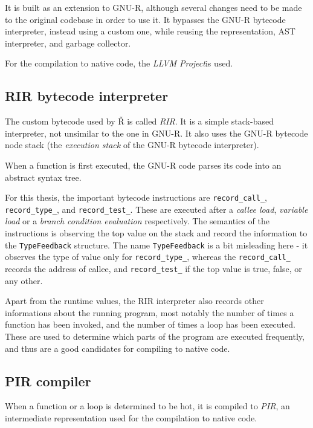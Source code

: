 It is built as an extension to GNU-R, although several changes need to be made to the original codebase in order to use it. It bypasses the GNU-R bytecode interpreter, instead using a custom one, while reusing the \SEXP representation, AST interpreter, and garbage collector.

For the compilation to native code, the \textit{LLVM Project}\todocite is used.


\subsection{RIR bytecode interpreter}

The custom bytecode used by Ř is called \textit{RIR}. It is a simple stack-based interpreter, not unsimilar to the one in GNU-R. It also uses the GNU-R bytecode node stack (the \textit{execution stack} of the GNU-R bytecode interpreter).

When a function is first executed, the GNU-R code parses its code into an abstract syntax tree.


For this thesis, the important bytecode instructions are \texttt{record\_call\_}, \texttt{record\_type\_}, and \texttt{record\_test\_}. These are executed after a \textit{callee load}, \textit{variable load} or a \textit{branch condition evaluation} respectively. The semantics of the instructions is observing the top value on the stack and record the information to the  \texttt{TypeFeedback} structure. The name \texttt{TypeFeedback} is a bit misleading here - it observes the type of value only for \texttt{record\_type\_}, whereas the \texttt{record\_call\_} records the address of callee, and \texttt{record\_test\_} if the top value is true, false, or any other.

Apart from the runtime values, the RIR interpreter also records other informations about the running program, most notably the number of times a function has been invoked, and the number of times a loop has been executed. These are used to determine which parts of the program are executed frequently, and thus are a good candidates for compiling to native code.

\subsection{PIR compiler}
When a function or a loop is determined to be hot, it is compiled to \textit{PIR}, an intermediate representation used for the compilation to native code.

